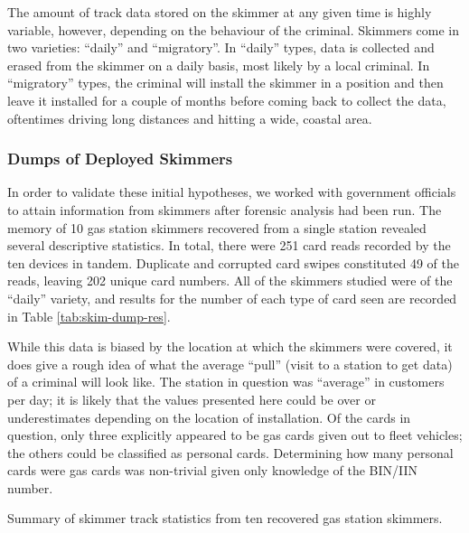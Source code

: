 The amount of track data stored on the skimmer at any given time is highly variable, however, depending on the behaviour
of the criminal.
%
Skimmers come in two varieties: ``daily'' and ``migratory''.
%
In ``daily'' types, data is collected and erased from the skimmer on a daily basis, most likely by a local criminal.
%
In ``migratory'' types, the criminal will install the skimmer in a position and then leave it installed for a couple
of months before coming back to collect the data, oftentimes driving long distances and hitting a wide, coastal area.

\subsubsection{Dumps of Deployed Skimmers}

In order to validate these initial hypotheses, we worked with government officials to attain information from skimmers
after forensic analysis had been run.
%
The memory of 10 gas station skimmers recovered from a single station revealed several descriptive statistics.
%
In total, there were 251 card reads recorded by the ten devices in tandem.
%
Duplicate and corrupted card swipes constituted 49 of the reads, leaving 202 unique card numbers.
%
All of the skimmers studied were of the ``daily'' variety, and results for the number of each type of card seen are
recorded in Table \ref{tab:skim-dump-res}.

While this data is biased by the location at which the skimmers were covered, it does give a rough idea of what the
average ``pull'' (visit to a station to get data) of a criminal will look like.
%
The station in question was ``average'' in customers per day;
%
it is likely that the values presented here could be over or underestimates depending on the location of installation.
%
Of the cards in question, only three explicitly appeared to be gas cards given out to fleet vehicles; the others could
be classified as personal cards.
%
Determining how many personal cards were gas cards was non-trivial given only knowledge of the BIN/IIN number.


\begin{table}
    \centering
    
    \caption{Summary of skimmer track statistics from ten recovered gas station skimmers.}
    \label{tab:skim-dump-res}
\end{table}

